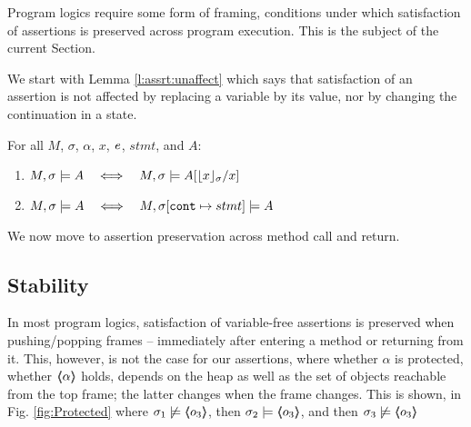 Program logics require some form of framing, \ie conditions under which  satisfaction of  assertions is preserved across program execution. 
This is the subject of the current Section.

We start with  Lemma \ref{l:assrt:unaffect}  which says that satisfaction of an assertion is not affected by replacing a variable by its value, nor by changing the continuation in a state.


\begin{lemma}
\label{lemma:addr:expr}
\label{l:assrt:unaffect}
For all $M$, $\sigma$, $\alpha$, $x$, $\mathit{e}$, $stmt$, and $A$:

\begin{enumerate}
\item
\label{one:ad:exp}
\label{l:assrt:unaffect:one}
$\satisfiesA{M}{\sigma}{A}   \ \ \ \Longleftrightarrow\ \ \ \satisfiesA{M}{\sigma}{A[{\interpret \sigma x}/x]}   $ 
\item
$ \satisfiesA{M}{\sigma}{A}   \ \ \ \Longleftrightarrow\ \ \ \satisfiesA{M}{\sigma[\prg{cont}\mapsto stmt]}{A}$ 
\end{enumerate}

\end{lemma}

 \noindent
We now move to assertion preservation across method call and return. %

\subsection{Stability} %
\label{s:preserve:call:ret}
In most program logics, satisfaction of  variable-free assertions  is preserved when pushing/popping frames
-- \ie immediately after entering a method or  returning from it.
This, however, is not   the case for our assertions, where whether $\alpha$ is protected, \ie whether   $\langle\!\!\langle \alpha \rangle\!\!\rangle$ holds, depends on the heap as well as the set of objects reachable from the top frame;
the latter  changes when the frame changes.
This is shown, \eg in  Fig. \ref{fig:Protected} where 
$\sigma_1 \not\models \langle\!\!\langle o_3 \rangle\!\!\rangle$, then $\sigma_2 \models \langle\!\!\langle o_3 \rangle\!\!\rangle$, and then $\sigma_3  \not\models \langle\!\!\langle o_3 \rangle\!\!\rangle$

